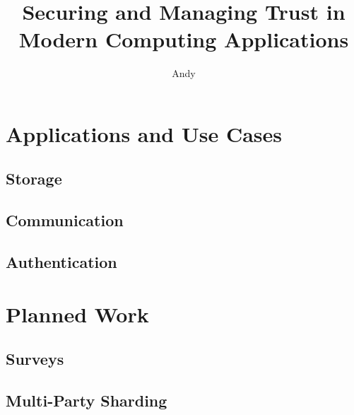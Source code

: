 \documentclass[defaultstyle,11pt]{thesis}
\title{Securing and Managing Trust in Modern Computing Applications}
\author{Andy}{Sayler}
\begin{document}









%


%
\chapter{Applications and Use Cases}
\label{chap:apps}

\section{Storage}
\section{Communication}
\section{Authentication}

%
\chapter{Planned Work}
\label{chap:planned}

\section{Surveys}
\section{Multi-Party Sharding}
\end{document}
